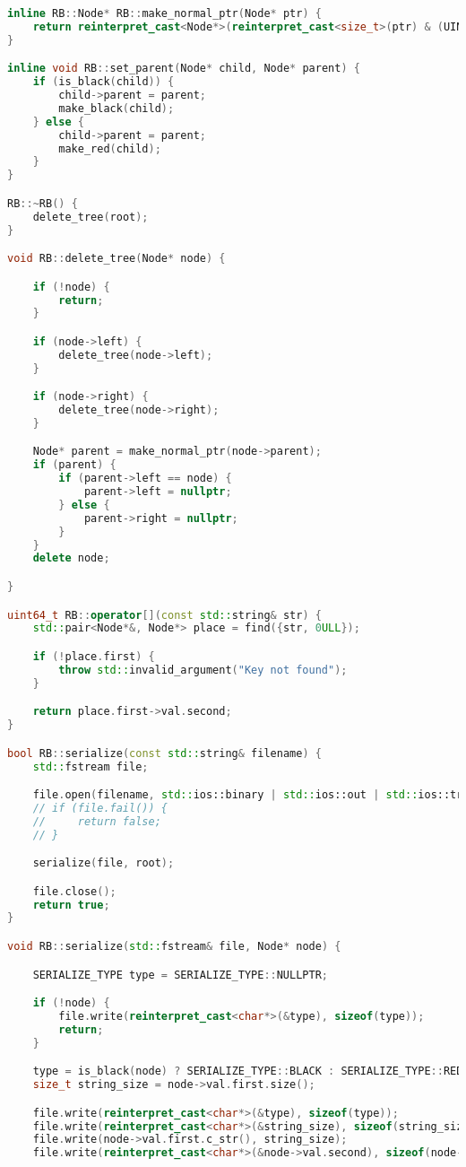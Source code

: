 \begin{lstlisting}[language=C++]
inline RB::Node* RB::make_normal_ptr(Node* ptr) {
    return reinterpret_cast<Node*>(reinterpret_cast<size_t>(ptr) & (UINT64_MAX - 1));
}

inline void RB::set_parent(Node* child, Node* parent) {
    if (is_black(child)) {
        child->parent = parent;
        make_black(child);
    } else {
        child->parent = parent;
        make_red(child);
    }
}

RB::~RB() {
    delete_tree(root);
}

void RB::delete_tree(Node* node) {

    if (!node) {
        return;
    }

    if (node->left) {
        delete_tree(node->left);
    }

    if (node->right) {
        delete_tree(node->right);
    }

    Node* parent = make_normal_ptr(node->parent);
    if (parent) {
        if (parent->left == node) {
            parent->left = nullptr;
        } else {
            parent->right = nullptr;
        }
    }
    delete node;

}

uint64_t RB::operator[](const std::string& str) {
    std::pair<Node*&, Node*> place = find({str, 0ULL});

    if (!place.first) {
        throw std::invalid_argument("Key not found");
    }

    return place.first->val.second;
}

bool RB::serialize(const std::string& filename) {
    std::fstream file;

    file.open(filename, std::ios::binary | std::ios::out | std::ios::trunc);
    // if (file.fail()) {
    //     return false;
    // }

    serialize(file, root);

    file.close();
    return true;
}

void RB::serialize(std::fstream& file, Node* node) {

    SERIALIZE_TYPE type = SERIALIZE_TYPE::NULLPTR;

    if (!node) {
        file.write(reinterpret_cast<char*>(&type), sizeof(type));
        return;
    }

    type = is_black(node) ? SERIALIZE_TYPE::BLACK : SERIALIZE_TYPE::RED;
    size_t string_size = node->val.first.size();

    file.write(reinterpret_cast<char*>(&type), sizeof(type));
    file.write(reinterpret_cast<char*>(&string_size), sizeof(string_size));
    file.write(node->val.first.c_str(), string_size);
    file.write(reinterpret_cast<char*>(&node->val.second), sizeof(node->val.second));


\end{lstlisting}
